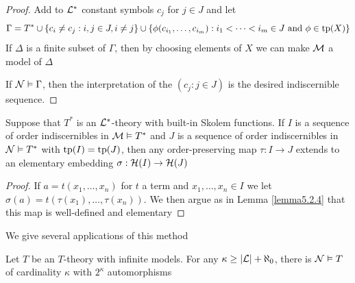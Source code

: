 \documentclass[11pt]{article}
\begin{document}
\begin{proof}
Add to \(\mathcal{L}^*\) constant symbols \(c_j\) for \(j\in J\) and let
\begin{equation*}
\Gamma=T^*\cup\{c_i\neq c_j:i,j\in J,i\neq j\}\cup\{\phi(c_{i_1},\dots,c_{i_m}):i_1<\dots<i_m\in J\text{ and }\phi\in\operatorname{tp}(X)\}
\end{equation*}
If \(\Delta\) is a finite subset of \(\Gamma\), then by choosing elements of \(X\) we can make \(\mathcal{M}\) a model of
\(\Delta\)

If \(\mathcal{N}\vDash\Gamma\), then the interpretation of the \((c_j:j\in J)\) is the desired indiscernible sequence.
\end{proof}

\begin{lemma}[]
\label{lemma5.2.6}
Suppose that \(T^*\) is an \(\mathcal{L}^*\)-theory with built-in Skolem functions. If \(I\) is a sequence
of order indiscernibles in \(\mathcal{M}\vDash T^*\) and \(J\) is a sequence of order indiscernibles
in \(\mathcal{N}\vDash T^*\) with \(\operatorname{tp}(I)=\operatorname{tp}(J)\), then any order-preserving map \(\tau:I\to J\) extends to an
elementary embedding \(\sigma:\mathcal{H}(I)\to\mathcal{H}(J)\)
\end{lemma}

\begin{proof}
If \(a=t(x_1,\dots,x_n)\) for \(t\) a term and \(x_1,\dots,x_n\in I\) we let \(\sigma(a)=t(\tau(x_1),\dots,\tau(x_n))\). We
then argue as in Lemma \ref{lemma5.2.4} that this map is well-defined and elementary
\end{proof}

We give several applications of this method

\begin{corollary}[]
Let \(T\) be an \(T\)-theory with infinite models. For any \(\kappa\ge\abs{\call}+\aleph_0\), there
is \(\mathcal{N}\vDash T\) of cardinality \(\kappa\) with \(2^\kappa\) automorphisms
\end{corollary}
\end{document}
